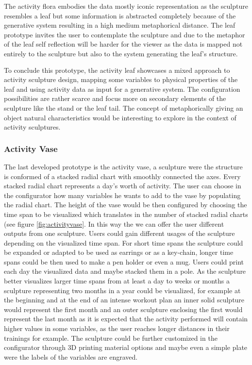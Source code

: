 \documentclass[../medieninformatik-arbeit.tex]{subfiles}
\begin{document}
The activity flora embodies the data mostly iconic representation as the sculpture resembles a leaf but some information is abstracted completely because of the generative system resulting in a high medium metaphorical distance. The leaf prototype invites the user to contemplate the sculpture and due to the metaphor of the leaf self reflection will be harder for the viewer as the data is mapped not entirely to the sculpture but also to the system generating the leaf's structure.

To conclude this prototype, the activity leaf showcases a mixed approach to activity sculpture design, mapping some variables to physical properties of the leaf and using activity data as input for a generative system. The configuration possibilities are rather scarce and focus more on secondary elements of the sculpture like the stand or the leaf tail. The concept of metaphorically giving an object natural characteristics would be interesting to explore in the context of activity sculptures.

\subsubsection{Activity Vase}
\label{sub:activtyvase}
The last developed prototype is the activity vase, a sculpture were the structure is conformed of a stacked radial chart with smoothly connected the axes. Every stacked radial chart represents a day's worth of activity. The user can choose in the configurator how many variables he wants to add to the vase by populating the radial chart. The height of the vase would be then configured by choosing the time span to be visualized which translates in the number of stacked radial charts (see figure \ref{fig:activityvase}. In this way the we can offer the user different outputs from one sculpture. Users could gain different usages of the sculpture depending on the visualized time span. For short time spans the sculpture could be expanded or adapted to be used as earrings or as a key-chain, longer time spans could be then used to make a pen holder or even a mug. Users could print each day the visualized data and maybe stacked them in a pole. As the sculpture better visualizes larger time spans from at least a day to weeks or months a sculpture representing two months in a year could be visualized, for example at the beginning and at the end of an intense workout plan an inner solid sculpture would represent the first month and an outer sculpture enclosing the first would represent the last month as it is expected that the activity performed will contain higher values in some variables, as the user reaches longer distances in their trainings for example. The sculpture could be further customized in the configurator through 3D printing material options and maybe even a simple plate were the labels of the variables are engraved. 
\end{document}
